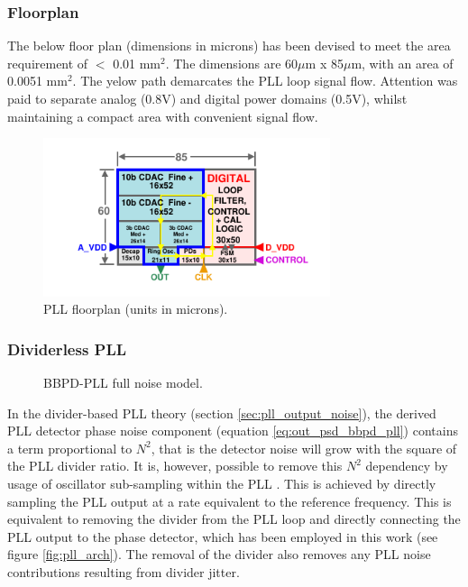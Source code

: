 	\subsubsection{Floorplan}
	The below floor plan (dimensions in microns) has been devised to meet the area requirement of $<$ 0.01 mm$^2$. The dimensions are 60$\mu$m x 85$\mu$m, with an area of 0.0051 mm$^2$. The yelow path demarcates the PLL loop signal flow. Attention was paid to separate analog (0.8V) and digital power domains (0.5V), whilst maintaining a compact area with convenient signal flow.
		\begin{figure}[htb!]
	        \centering
	        \includegraphics[width=0.75\textwidth, angle=0]{./figs/design/pll_floorplan3}
		    \caption{PLL floorplan (units in microns).}
		\end{figure}

\subsubsection{Dividerless PLL}

\begin{figure}[htb!]
	\center
	\caption{BBPD-PLL full noise model.}
	\label{fig:bbpll_full_noise}
\end{figure}

In the divider-based PLL theory (section \ref{sec:pll_output_noise}), the derived PLL detector phase noise component (equation \ref{eq:out_psd_bbpd_pll}) contains a term proportional to $N^2$, that is the detector noise will grow with the square of the PLL divider ratio. It is, however, possible to remove this $N^2$ dependency by usage of oscillator sub-sampling within the PLL \cite{Gao2015}. This is achieved by directly sampling the PLL output at a rate equivalent to the reference frequency. This is equivalent to removing the divider from the PLL loop and directly connecting the PLL output to the phase detector, which has been employed in this work (see figure \ref{fig:pll_arch}). The removal of the divider also removes any PLL noise contributions resulting from divider jitter. 

